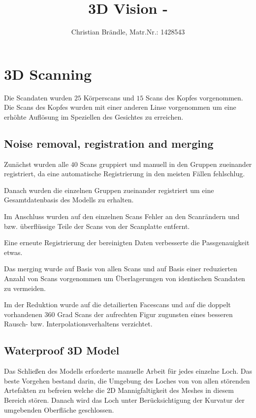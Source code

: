 \documentclass[]{article}
\title{3D Vision - }
\author{Christian Br\"andle, Matr.Nr.: 1428543}
\begin{document}
\maketitle


\section{3D Scanning}

Die Scandaten wurden $25$ Körperscans und $15$ Scans des Kopfes vorgenommen.
Die Scans des Kopfes wurden mit einer anderen Linse vorgenommen um eine erhöhte Auflösung im Speziellen des Gesichtes zu erreichen.

\subsection{Noise removal, registration and merging}

Zunächst wurden alle $40$ Scans gruppiert und manuell in den Gruppen zueinander registriert, da eine automatische Registrierung in den meisten Fällen fehlschlug.

Danach wurden die einzelnen Gruppen zueinander registriert um eine Gesamtdatenbasis des Modells zu erhalten.

Im Anschluss wurden auf den einzelnen Scans Fehler an den Scanrändern und bzw. überflüssige Teile der Scans von der Scanplatte entfernt.

Eine erneute Registrierung der bereinigten Daten verbesserte die Passgenauigkeit etwas. 

Das merging wurde auf Basis von allen Scans und auf Basis einer reduzierten Anzahl von Scans vorgenommen um Überlagerungen von identischen Scandaten zu vermeiden.

Im der Reduktion wurde auf die detailierten Facescans und auf die doppelt vorhandenen 360 Grad Scans der aufrechten Figur zugunsten eines besseren Rausch- bzw. Interpolationsverhaltens verzichtet.

\subsection{Waterproof 3D Model}

Das Schließen des Modells erforderte manuelle Arbeit für jedes einzelne Loch. Das beste Vorgehen bestand darin, die Umgebung des Loches von von allen störenden Artefakten zu befreien welche die 2D Mannigfaltigkeit des Meshes in diesem Bereich stören. Danach wird das Loch unter Berücksichtigung der Kurvatur der umgebenden Oberfläche geschlossen.
\end{document}
